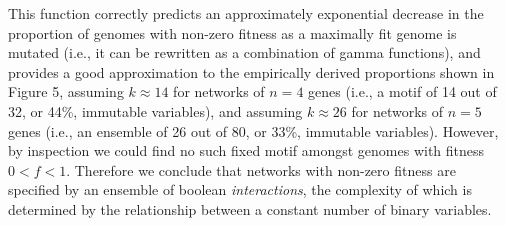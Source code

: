 \documentclass[10pt,letterpaper]{article}
\begin{document}
This function correctly predicts an approximately exponential decrease in the proportion of genomes with non-zero fitness as a maximally fit genome is mutated (i.e., it can be rewritten as a combination of gamma functions), and provides a good approximation to the empirically derived proportions shown in Figure 5, assuming $k\approx 14$ for networks of $n=4$ genes (i.e., a motif of 14 out of 32, or 44\%, immutable variables), and assuming $k\approx 26$ for networks of $n=5$ genes (i.e., an ensemble of 26 out of 80, or 33\%, immutable variables). However, by inspection we could find no such fixed motif amongst genomes with fitness $0<f<1$. Therefore we conclude that networks with non-zero fitness are specified by an ensemble of boolean \emph{interactions}, the complexity of which is determined by the relationship between a constant number of binary variables.





\end{document}
